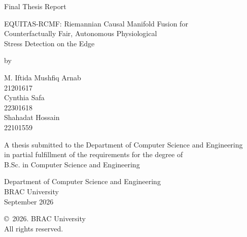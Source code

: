 \begin{titlepage}
\renewcommand*{\thepage}{Title}

    \begin{center}
        \vspace*{2cm}

        {\fontsize{14pt}{18pt}\selectfont Final Thesis Report}

        \vspace{1cm}

        {\fontsize{16pt}{22pt}\selectfont
        EQUITAS-RCMF: Riemannian Causal Manifold Fusion for\\
        Counterfactually Fair, Autonomous Physiological\\
        Stress Detection on the Edge
        }

        \vspace{1.5cm}

        by

        \vspace{0.5cm}

        M. Iftida Mushfiq Arnab\\
        21201617\\[0.3cm]

        Cynthia Safa\\
        22301618\\[0.3cm]

        Shahadat Hossain\\
        22101559

        \vspace{1.5cm}

        A thesis submitted to the Department of Computer Science and Engineering\\
        in partial fulfillment of the requirements for the degree of\\
        B.Sc. in Computer Science and Engineering

        \vspace{2.5cm}

        Department of Computer Science and Engineering\\
        BRAC University\\
        September 2026

        \vspace{3cm}

        \copyright\ 2026. BRAC University\\
        All rights reserved.

    \end{center}

\end{titlepage}
